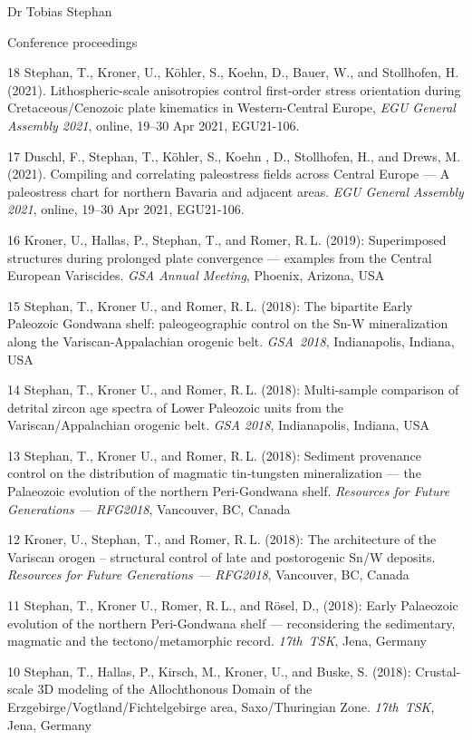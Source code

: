 \documentclass[10pt, paper=letter]{scrartcl} %
\begin{document}
\begin{cv}{Dr Tobias Stephan}
\begin{cvlist}{Conference proceedings}
    \item[18] Stephan, T., Kroner, U., K\"ohler, S., Koehn, D., Bauer, W., and Stollhofen, H. (2021). Lithospheric-scale anisotropies control first-order stress orientation during Cretaceous\-/Cenozoic plate kinematics in Western-Central Europe, \textit{EGU General Assembly 2021}, online, 19--30 Apr 2021, EGU21-106. 
    \item[17] Duschl, F., Stephan, T., K\"ohler, S., Koehn , D., Stollhofen, H., and Drews, M. (2021). Compiling and correlating paleostress fields across Central Europe --- A paleostress chart for northern Bavaria and adjacent areas. \textit{EGU General Assembly 2021}, online, 19--30 Apr 2021, EGU21-106. 
    \item[16] Kroner, U., Hallas, P., Stephan, T., and Romer, R.\,L. (2019): Superimposed structures during prolonged plate convergence --- examples from the Central European Variscides. \textit{GSA Annual Meeting}, Phoenix, Arizona, USA
    \item[15] Stephan, T., Kroner U., and Romer, R.\,L. (2018): The bipartite Early Paleozoic Gondwana shelf: paleogeographic control on the Sn-W mineralization along the Variscan-Appalachian orogenic belt. \mbox{\textit{GSA 2018}}, Indianapolis, Indiana, USA
    \item[14] Stephan, T., Kroner U., and Romer, R.\,L. (2018): Multi-sample comparison of detrital zircon age spectra of Lower Paleozoic units from the Variscan\-/Appalachian orogenic belt. \textit{GSA 2018}, Indianapolis, Indiana, USA
    \item[13] Stephan, T., Kroner U., and Romer, R.\,L. (2018): Sediment provenance control on the distribution of magmatic tin-tungsten mineralization --- the Palaeozoic evolution of the northern Peri-Gondwana shelf. \textit{Resources for Future Generations --- RFG2018}, Vancouver, BC, Canada
    \item[12]Kroner, U., Stephan, T., and Romer, R.\,L. (2018): The architecture of the Variscan orogen – structural control of late and postorogenic Sn/W deposits.  \textit{Resources for Future Generations --- RFG2018}, Vancouver, BC, Canada
    \item[11] Stephan, T., Kroner U., Romer, R.\,L., and R\"osel, D., (2018): Early Palaeozoic evolution of the northern Peri-Gondwana shelf --- reconsidering the sedimentary, magmatic and the tectono\-/metamorphic record. \mbox{\textit{17th TSK}}, Jena, Germany
    \item[10] Stephan, T., Hallas, P., Kirsch, M., Kroner, U., and Buske, S. (2018): Crustal-scale 3D modeling of the Allochthonous Domain of the Erzgebirge\-/Vogtland\-/Fichtelgebirge area, Saxo\-/Thuringian Zone. \textit{17th~TSK}, Jena, Germany

\end{cvlist}
\end{cv}
\end{document}
